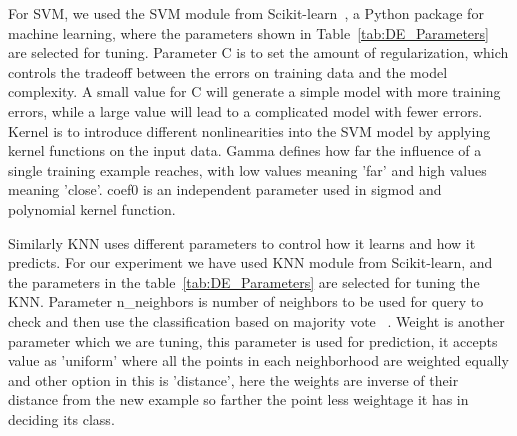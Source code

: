 \documentclass[sigconf]{acmart}
\theoremstyle{break}
\begin{document}
    
    For SVM, we used the SVM module from Scikit-learn~\cite{pedregosa2011scikit}, a Python package for machine learning, where the parameters shown in Table~\ref{tab:DE_Parameters} are selected for tuning. Parameter C is to set the amount of regularization, which controls the tradeoff between the errors on training data and the model complexity. A small value for C will generate a simple model with more training errors, while a large value will lead to a complicated model with fewer errors. Kernel is to introduce different nonlinearities into the SVM model by applying kernel functions on the input data. Gamma defines how far the influence of a single training example reaches, with low values meaning 'far' and high values meaning 'close'. coef0 is an independent parameter used in sigmod and polynomial kernel function.
    
    Similarly KNN uses different parameters to control how it learns and how it predicts. For our experiment we have used KNN module from Scikit-learn, and the parameters in the table~\ref{tab:DE_Parameters} are selected for tuning the KNN. Parameter n\_neighbors is number of neighbors to be used for query to check and then use the classification based on majority vote ~\cite{guo2003knn}. Weight is another parameter which we are tuning, this parameter is used for prediction, it accepts value as 'uniform' where all the points in each neighborhood are weighted equally and other option in this is 'distance', here the weights are inverse of their distance from the new example so farther the point less weightage it has in deciding its class.
    
\end{document}
